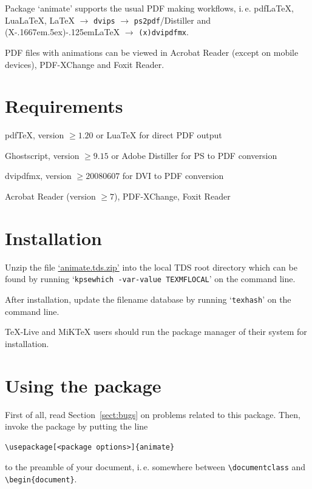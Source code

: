 \documentclass[a4paper]{article}
\def\pXepLaTeX{(X\kern-.1667em\lower.5ex\hbox{\reflectbox{E}})\kern-.125em\LaTeX}
\begin{document}
Package `animate' supports the usual PDF making workflows, i.\,e. pdf\LaTeX{}, Lua\LaTeX{}, \LaTeX{} $\rightarrow$ \verb+dvips+ $\rightarrow$ \verb+ps2pdf+/Distiller and \pXepLaTeX{} $\rightarrow$ \verb+(x)dvipdfmx+.

PDF files with animations can be viewed in Acrobat Reader (except on mobile devices), PDF-XChange and Foxit Reader.

\section{Requirements}
\begin{trivlist}
\item pdf\TeX{}, version $\ge1.20$ or Lua\TeX{} for direct PDF output
\item Ghostscript, version $\ge9.15$ or Adobe Distiller for PS to PDF conversion
\item dvipdfmx, version $\ge20080607$ for DVI to PDF conversion
\item Acrobat Reader (version $\ge7$), PDF-XChange, Foxit Reader
\end{trivlist}

\section{Installation}
Unzip the file \href{http://mirrors.ctan.org/install/macros/latex/contrib/animate.tds.zip}{`animate.tds.zip'} into the local TDS root directory which can be found by running `\verb+kpsewhich -var-value TEXMFLOCAL+' on the command line.

After installation, update the filename database by running `\verb+texhash+' on the command line.

\TeX-Live and MiK\TeX{} users should run the package manager of their system for installation.

\section{Using the package}
First of all, read Section~\ref{sect:bugs} on problems related to this package. Then, invoke the package by putting the line
\begin{verbatim}
\usepackage[<package options>]{animate}
\end{verbatim}
to the preamble of your document, i.\,e. somewhere between \verb+\documentclass+ and \verb+\begin{document}+.
\end{document}
